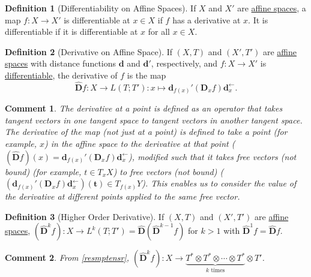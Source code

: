 \documentclass[letterpaper,12pt]{article}
\theoremstyle{plain}
\theoremstyle{plain}
\newtheorem*{cmnt*}{Comment}
\theoremstyle{definition}
\newtheorem{defn}{Definition}
\begin{document}
\begin{defn}[Differentiability on Affine Spaces]\label{defdfrbla}
If $X$ and $X'$ are \hyperref[defafsp]{affine spaces}, a map $f:X\rightarrow X'$ is differentiable at $x\in X$ if $f$ has a derivative at $x$. It is differentiable if it is differentiable at $x$ for all $x \in X$.
\end{defn}

\begin{defn}[Derivative on Affine Space]\label{defaderiv}
If $(X,T)$ and $(X',T')$ are \hyperref[defafsp]{affine spaces} with distance functions $\mathbf{d}$ and $\mathbf{d}'$, respectively, and $f:X\rightarrow X'$ is \hyperref[defdfrbla]{differentiable}, the derivative of $f$ is the map
\[ \hat{\mathbf{D}}f:X\rightarrow L(T;T'):x\mapsto \mathbf{d}_{f(x)}'(\mathbf{D}_x f) \mathbf{d}_x^{\leftarrow}.\]
\end{defn}

\begin{cmnt*}
The derivative at a point is defined as an operator that takes tangent vectors in one tangent space to tangent vectors in another tangent space. The derivative of the map (not just at a point) is defined to take a point (for example, $x$) in the affine space to the derivative at that point ($(\hat{\mathbf{D}}f)(x)=\mathbf{d}_{f(x)}'(\mathbf{D}_x f) \mathbf{d}_x^{\leftarrow}$), modified such that it takes free vectors (not bound) (for example, $t\in T_xX$) to free vectors (not bound) ($(\mathbf{d}_{f(x)}'(\mathbf{D}_x f) \mathbf{d}_x^{\leftarrow})(\mathbf{t})\in T_{f(x)}Y$). This enables us to consider the value of the derivative at different points applied to the same free vector.
\end{cmnt*}

\begin{defn}[Higher Order Derivative]\label{defhoderiv}
If $(X,T)$ and $(X',T')$ are \hyperref[defafsp]{affine spaces}, $(\hat{\mathbf{D}}^kf):X\rightarrow L^k(T;T')=\hat{\mathbf{D}}(\hat{\mathbf{D}}^{k-1}f)$ for $k>1$ with $\hat{\mathbf{D}}^1f=\hat{\mathbf{D}}f$.
\end{defn}

\begin{cmnt*} From \autoref{resmptensr}, $(\hat{\mathbf{D}}^kf):X\rightarrow \underbrace{T^* \otimes T^* \otimes \cdots \otimes T^*}_{k \text{ times}} \otimes T'$.
\end{cmnt*}
\end{document}
